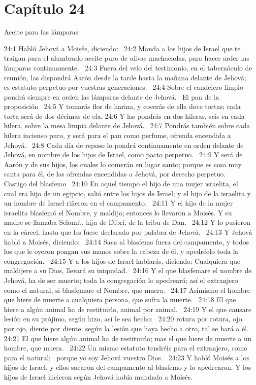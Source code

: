 \section*{Capítulo 24}
Aceite para las lámparas   

24:1 Habló Jehová a Moisés, diciendo:  
24:2 Manda a los hijos de Israel que te traigan para el alumbrado aceite puro de olivas machacadas, para hacer arder las lámparas continuamente.  
24:3 Fuera del velo del testimonio, en el tabernáculo de reunión, las dispondrá Aarón desde la tarde hasta la mañana delante de Jehová; es estatuto perpetuo por vuestras generaciones.  
24:4 Sobre el candelero limpio pondrá siempre en orden las lámparas delante de Jehová.  
El pan de la proposición  
24:5 Y tomarás flor de harina, y cocerás de ella doce tortas; cada torta será de dos décimas de efa. 
24:6 Y las pondrás en dos hileras, seis en cada hilera, sobre la mesa limpia delante de Jehová.  
24:7 Pondrás también sobre cada hilera incienso puro, y será para el pan como perfume, ofrenda encendida a Jehová.  
24:8 Cada día de reposo lo pondrá continuamente en orden delante de Jehová, en nombre de los hijos de Israel, como pacto perpetuo.  
24:9 Y será de Aarón y de sus hijos, los cuales lo comerán en lugar santo; porque es cosa muy santa para él, de las ofrendas encendidas a Jehová, por derecho perpetuo.  
Castigo del blasfemo  
24:10 En aquel tiempo el hijo de una mujer israelita, el cual era hijo de un egipcio, salió entre los hijos de Israel; y el hijo de la israelita y un hombre de Israel riñeron en el campamento.  
24:11 Y el hijo de la mujer israelita blasfemó el Nombre, y maldijo; entonces lo llevaron a Moisés. Y su madre se llamaba Selomit, hija de Dibri, de la tribu de Dan.  
24:12 Y lo pusieron en la cárcel, hasta que les fuese declarado por palabra de Jehová.  
24:13 Y Jehová habló a Moisés, diciendo:  
24:14 Saca al blasfemo fuera del campamento, y todos los que le oyeron pongan sus manos sobre la cabeza de él, y apedréelo toda la congregación.  
24:15 Y a los hijos de Israel hablarás, diciendo: Cualquiera que maldijere a su Dios, llevará su iniquidad.  
24:16 Y el que blasfemare el nombre de Jehová, ha de ser muerto; toda la congregación lo apedreará; así el extranjero como el natural, si blasfemare el Nombre, que muera.  
24:17 Asimismo el hombre que hiere de muerte a cualquiera persona, que sufra la muerte.  
24:18 El que hiere a algún animal ha de restituirlo, animal por animal.  
24:19 Y el que causare lesión en su prójimo, según hizo, así le sea hecho:  
24:20 rotura por rotura, ojo por ojo, diente por diente; según la lesión que haya hecho a otro, tal se hará a él.  
24:21 El que hiere algún animal ha de restituirlo; mas el que hiere de muerte a un hombre, que muera.  
24:22 Un mismo estatuto tendréis para el extranjero, como para el natural;  porque yo soy Jehová vuestro Dios.  
24:23 Y habló Moisés a los hijos de Israel, y ellos sacaron del campamento al blasfemo y lo apedrearon. Y los hijos de Israel hicieron según Jehová había mandado a Moisés.  
